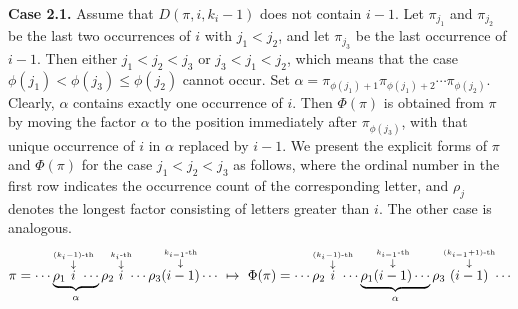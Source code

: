 \documentclass[11pt]{article}
\numberwithin{equation}{section}
\begin{document}
\noindent\textbf{Case 2.1.} Assume that $D(\pi,i,k_i-1)$ does not contain $i-1$. Let $\pi_{j_1}$ and $\pi_{j_2}$ be the last two occurrences of $i$ with $j_1<j_2$, and let $\pi_{j_3}$ be the last occurrence of $i-1$. Then either $j_1<j_2<j_3$ or $j_3<j_1<j_2$, which means that the case $\phi(j_1)<\phi(j_3)\le \phi(j_2)$ cannot occur. Set $\alpha=\pi_{\phi(j_1)+1}\pi_{\phi(j_1)+2}\cdots\pi_{\phi(j_2)}$. Clearly, $\alpha$ contains exactly one occurrence of $i$. Then $\Phi(\pi)$ is obtained from $\pi$ by moving the factor $\alpha$ to the position immediately after $\pi_{\phi(j_3)}$, with that unique occurrence of $i$ in $\alpha$ replaced by $i-1$. We present the explicit forms of $\pi$ and $\Phi(\pi)$ for the case $j_1 < j_2 < j_3$ as follows, where the ordinal number in the first row indicates the occurrence count of the corresponding letter, and $\rho_j$ denotes the longest factor consisting of letters greater than $i$. The other case is analogous.
\begin{gather}\label{EQ:form-case2.1}
\pi=\cdots \underbrace{\rho_1
	\mkern-17mu \overset{\overset{(k_i-1)\text{-th}}{\downarrow}}{i}\mkern-17mu
	\cdots}_{\alpha}
\rho_2
\mkern-5mu
\overset{\overset{k_i\text{-th}}{\downarrow}}{i}
\mkern-5mu
\cdots
\rho_3
\overset{\overset{k_{i-1}\text{-th}}{\downarrow}}{(i-1)}
\cdots
\ \mapsto\ 
%
%
\Phi(\pi)=\cdots 
\rho_2
\mkern-17mu
\overset{\overset{(k_i-1)\text{-th}}{\downarrow}}{i}
\mkern-17mu
\cdots
\underbrace{\rho_1
	\overset{\overset{k_{i-1}\text{-th}}{\downarrow}}{(i-1)}
	\cdots}_{\alpha}
\rho_3
\mkern-3mu
\overset{\overset{(k_{i-1}+1)\text{-th}}{\downarrow}}{(i-1)}
\mkern-3mu
\cdots
\end{gather}
\end{document}
